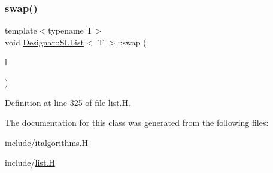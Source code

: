 \subsubsection{\texorpdfstring{swap()}{swap()}}
{\footnotesize\ttfamily template$<$typename T$>$ \\
void \hyperlink{class_designar_1_1_s_l_list}{Designar\+::\+S\+L\+List}$<$ T $>$\+::swap (\begin{DoxyParamCaption}\item[{\hyperlink{class_designar_1_1_s_l_list}{S\+L\+List}$<$ T $>$ \&}]{l }\end{DoxyParamCaption})\hspace{0.3cm}{\ttfamily [inline]}}



Definition at line 325 of file list.\+H.



The documentation for this class was generated from the following files\+:\begin{DoxyCompactItemize}
\item 
include/\hyperlink{italgorithms_8_h}{italgorithms.\+H}\item 
include/\hyperlink{list_8_h}{list.\+H}\end{DoxyCompactItemize}
